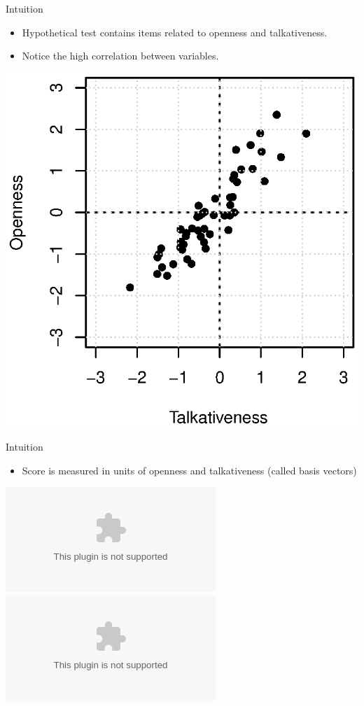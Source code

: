 \begin{frame}{Intuition}
	\begin{minipage}{0.47\textwidth}
    		\begin{itemize}
        		\item Hypothetical test contains items related to openness and talkativeness.
			\item Notice the high correlation between variables.
    		\end{itemize}
	\end{minipage}
	\begin{minipage}{0.5\textwidth}
    		\begin{center}
        		\includegraphics[scale=.6, left]{figures/pca1.eps}
    		\end{center}
	\end{minipage}
\end{frame}

\begin{frame}{Intuition}
	\begin{minipage}{0.47\textwidth}
    		\begin{itemize}
        		\item Score is measured in units of openness and talkativeness (called basis 
				  vectors)
    		\end{itemize}
	\end{minipage}
	\begin{minipage}{0.5\textwidth}
    		\begin{center}
        		\includegraphics<1>[scale=.6, left]{figures/pca2.eps}
			\includegraphics<2>[scale=.6, left]{figures/pca3.eps}
    		\end{center}
	\end{minipage}
\end{frame}

